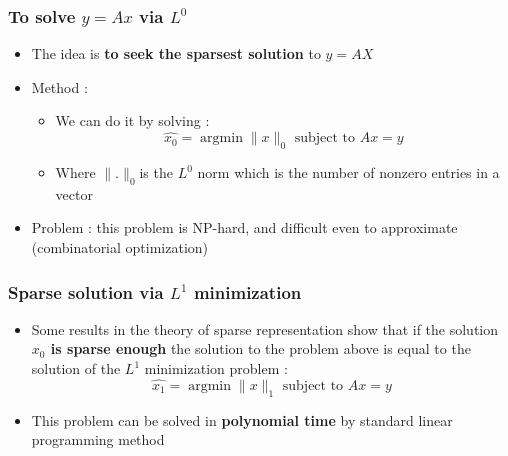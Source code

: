 \documentclass{beamer}
\DeclareMathOperator{\argmin}{argmin} %
\begin{document}
\begin{frame}

		\frametitle{To solve $y=Ax$ via $L^{0}$}		
			
\begin{itemize}
\item The idea is \textbf{to seek the sparsest solution} to $y=AX$
\item Method :
	\begin{itemize}
	\item We can do it by solving : 
	$$ \hat{x_{0}}= \argmin \|x\|_{0}  \mbox{ subject to } Ax=y$$
	\item Where $\|.\|_{0} $is the $L^{0}$ norm which is the number of nonzero entries in a vector
	\end{itemize}
\item Problem : this problem is NP-hard, and difficult even to approximate (combinatorial optimization)


\end{itemize}

\end{frame}
		
\begin{frame}

		\frametitle{Sparse solution via  $L^{1}$ minimization}		
			
\begin{itemize}
\item Some results in the theory of sparse representation show that if the solution \textbf{$x_{0}$ is sparse enough} the solution to the problem above is equal to the solution of the $L^{1 }$ minimization problem :
	$$ \hat{x_{1}}= \argmin \|x\|_{1}  \mbox{ subject to } Ax=y$$
	
\item This problem can be solved in \textbf{polynomial time} by standard linear programming method

\end{itemize}

\end{frame}

		
\end{document}
